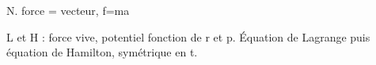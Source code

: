 N. force = vecteur, f=ma

L et H : force vive, potentiel fonction de r et p. Équation de Lagrange puis équation de Hamilton, symétrique en t.



